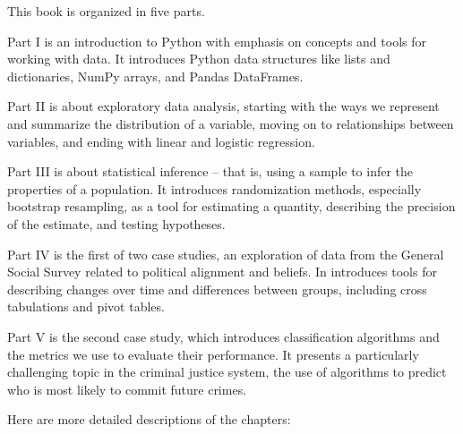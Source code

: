 This book is organized in five parts.

Part I is an introduction to Python with emphasis on concepts and tools for working with data. It introduces Python data structures like lists and dictionaries, NumPy arrays, and Pandas DataFrames.

Part II is about exploratory data analysis, starting with the ways we represent and summarize the distribution of a variable, moving on to relationships between variables, and ending with linear and logistic regression.

Part III is about statistical inference -- that is, using a sample to infer the properties of a population. It introduces randomization methods, especially bootstrap resampling, as a tool for estimating a quantity, describing the precision of the estimate, and testing hypotheses.

Part IV is the first of two case studies, an exploration of data from the General Social Survey related to political alignment and beliefs. In introduces tools for describing changes over time and differences between groups, including cross tabulations and pivot tables.

Part V is the second case study, which introduces classification algorithms and the metrics we use to evaluate their performance. It presents a particularly challenging topic in the criminal justice system, the use of algorithms to predict who is most likely to commit future crimes.

Here are more detailed descriptions of the chapters:


